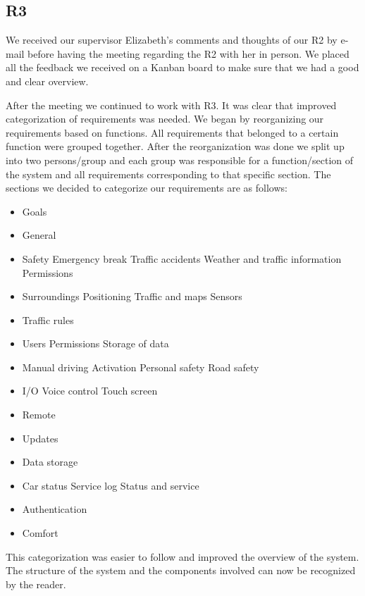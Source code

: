 \documentclass[10pt]{article}
\begin{document}
\subsection{R3}
We received our supervisor Elizabeth's comments and thoughts of our R2 by e-mail before having the meeting regarding the R2 with her in person. We placed all the feedback we received on a Kanban board to make sure that we had a good and clear overview.

After the meeting we continued to work with R3. It was clear that improved categorization of requirements was needed. We began by reorganizing our requirements based on functions. All requirements that belonged to a certain function were grouped together. After the reorganization was done we split up into two persons/group and each group was responsible for a function/section of the system and all requirements corresponding to that specific section. 
The sections we decided to categorize our requirements are as follows:
\begin{itemize}
\item Goals
\item General
\item Safety
\subitem Emergency break
\subitem Traffic accidents
\subitem Weather and traffic information
\subitem Permissions
\item Surroundings
\subitem Positioning
\subitem Traffic and maps
\subitem Sensors
\item Traffic rules
\item Users
\subitem Permissions
\subitem Storage of data
\item Manual driving
\subitem Activation
\subitem Personal safety
\subitem Road safety
\item I/O
\subitem Voice control
\subitem Touch screen
\item Remote
\item Updates
\item Data storage
\item Car status
\subitem Service log
\subitem Status and service
\item Authentication
\item Comfort
\end{itemize}
This categorization was easier to follow and improved the overview of the system. The structure of the system and the components involved can now be recognized by the reader. 
\end{document}
